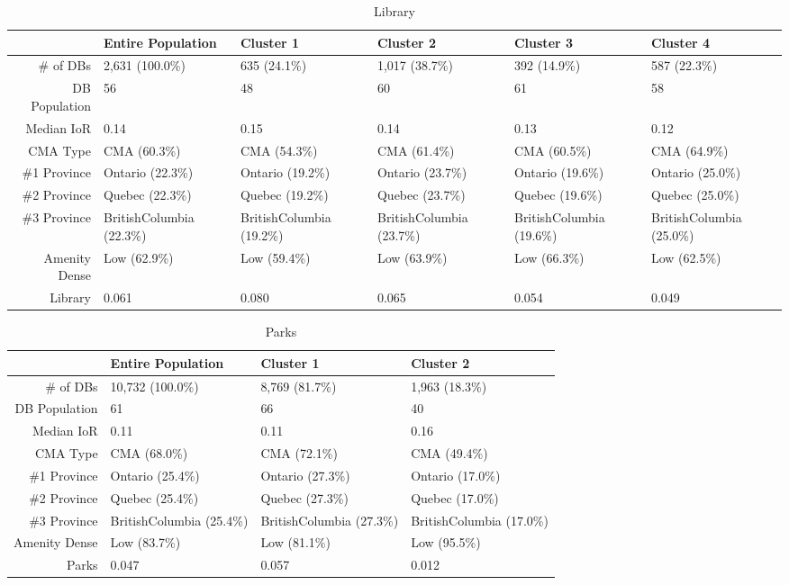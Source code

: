 \documentclass[11pt, a4paper]{article}
\begin{document}
\begin{sidewaystable}[ht]
\centering
\begin{tabular}{rlllll}
  \hline
 & Entire Population & Cluster 1 & Cluster 2 & Cluster 3 & Cluster 4 \\ 
  \hline
\# of DBs & 2,631 (100.0\%) & 635 (24.1\%) & 1,017 (38.7\%) & 392 (14.9\%) & 587 (22.3\%) \\ 
  DB Population & 56 & 48 & 60 & 61 & 58 \\ 
  Median IoR & 0.14 & 0.15 & 0.14 & 0.13 & 0.12 \\ 
  CMA Type & CMA (60.3\%) & CMA (54.3\%) & CMA (61.4\%) & CMA (60.5\%) & CMA (64.9\%) \\ 
  \#1 Province & Ontario (22.3\%) & Ontario (19.2\%) & Ontario (23.7\%) & Ontario (19.6\%) & Ontario (25.0\%) \\ 
  \#2 Province & Quebec (22.3\%) & Quebec (19.2\%) & Quebec (23.7\%) & Quebec (19.6\%) & Quebec (25.0\%) \\ 
  \#3 Province & BritishColumbia (22.3\%) & BritishColumbia (19.2\%) & BritishColumbia (23.7\%) & BritishColumbia (19.6\%) & BritishColumbia (25.0\%) \\ 
  Amenity Dense & Low (62.9\%) & Low (59.4\%) & Low (63.9\%) & Low (66.3\%) & Low (62.5\%) \\ 
  Library & 0.061 & 0.080 & 0.065 & 0.054 & 0.049 \\ 
   \hline
\end{tabular}
\caption{Library} 
\end{sidewaystable}





 \pagebreak 
 
\begin{sidewaystable}[ht]
\centering
\begin{tabular}{rlll}
  \hline
 & Entire Population & Cluster 1 & Cluster 2 \\ 
  \hline
\# of DBs & 10,732 (100.0\%) & 8,769 (81.7\%) & 1,963 (18.3\%) \\ 
  DB Population & 61 & 66 & 40 \\ 
  Median IoR & 0.11 & 0.11 & 0.16 \\ 
  CMA Type & CMA (68.0\%) & CMA (72.1\%) & CMA (49.4\%) \\ 
  \#1 Province & Ontario (25.4\%) & Ontario (27.3\%) & Ontario (17.0\%) \\ 
  \#2 Province & Quebec (25.4\%) & Quebec (27.3\%) & Quebec (17.0\%) \\ 
  \#3 Province & BritishColumbia (25.4\%) & BritishColumbia (27.3\%) & BritishColumbia (17.0\%) \\ 
  Amenity Dense & Low (83.7\%) & Low (81.1\%) & Low (95.5\%) \\ 
  Parks & 0.047 & 0.057 & 0.012 \\ 
   \hline
\end{tabular}
\caption{Parks} 
\end{sidewaystable}
\end{document}
